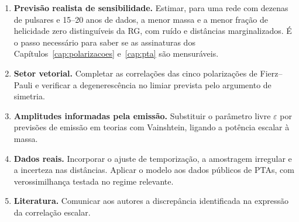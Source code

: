 \begin{enumerate}
 \item \textbf{Previsão realista de sensibilidade.} Estimar, para uma
 rede com dezenas de pulsares e 15--20 anos de dados, a menor massa e a
 menor fração de helicidade zero distinguíveis da RG, com ruído e
 distâncias marginalizados. É o passo necessário para saber se as
 assinaturas dos Capítulos~\ref{cap:polarizacoes} e~\ref{cap:pta} são
 mensuráveis.
 \item \textbf{Setor vetorial.} Completar as correlações das cinco
 polarizações de Fierz--Pauli e verificar a degenerescência no limiar
 prevista pelo argumento de simetria.
 \item \textbf{Amplitudes informadas pela emissão.} Substituir o
 parâmetro livre $\varepsilon$ por previsões de emissão em teorias com
 Vainshtein, ligando a potência escalar à massa.
 \item \textbf{Dados reais.} Incorporar o ajuste de temporização, a
 amostragem irregular e a incerteza nas distâncias. Aplicar o modelo aos
 dados públicos de PTAs, com verossimilhança testada no regime
 relevante.
 \item \textbf{Literatura.} Comunicar aos autores a discrepância
 identificada na expressão da correlação escalar.
\end{enumerate}
